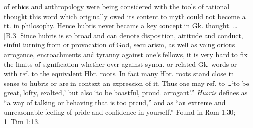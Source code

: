 of ethics and anthropology were being considered with the tools of rational thought this word which originally owed its content to myth could not become a tt. in philosophy. Hence hubris never became a key concept in Gk. thought. \ldots [B.3] Since hubris is so broad and can denote disposition, attitude and conduct, sinful turning from or provocation of God, secularism, as well as vainglorious arrogance, encroachments and tyranny against one's fellows, it is very hard to fix the limits of signification whether over against synon. or related Gk. words or with ref. to the equivalent Hbr. roots. In fact many Hbr. roots stand close in sense to hubris or are in context an expression of it. Thus one may ref. to \ldots `to be great, lofty, exalted,' but also `to be boastful, proud, arrogant'.''
 \emph{Hubris} defines as ``a way of talking or behaving that is too proud,'' and as ``an extreme and unreasonable feeling of pride and confidence in yourself.''
Found in Rom 1:30; 1~Tim 1:13.
